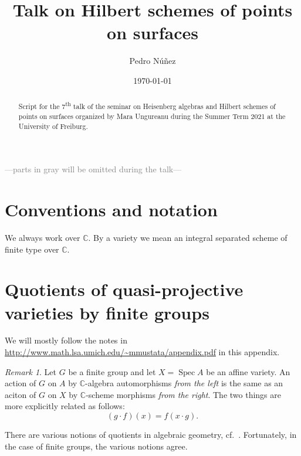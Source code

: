 \documentclass[12pt,a4paper]{amsart}
\title[Talk on Hilbert schemes of points on surfaces]{Talk on Hilbert schemes of points on surfaces}
\author[Pedro N\'{u}\~{n}ez]{Pedro N\'{u}\~{n}ez}
\date{\today}
\theoremstyle{plain}
\theoremstyle{definition}
\theoremstyle{remark}
\newtheorem{rem}[thm]{Remark}
\begin{document}
\maketitle

\begin{abstract}
  Script for the 7\textsuperscript{th} talk of the seminar on Heisenberg algebras and Hilbert schemes of points on surfaces organized by Mara Ungureanu during the Summer Term 2021 at the University of Freiburg.
\end{abstract}

\tableofcontents

\begin{center}
  \textcolor{gray}{---parts in gray will be omitted during the talk---}
\end{center}

\setcounter{section}{-1}

\section{Conventions and notation}

We always work over $\mathbb{C}$.
By a variety we mean an integral separated scheme of finite type over $\mathbb{C}$.

\appendix

\section{Quotients of quasi-projective varieties by finite groups}

We will mostly follow the notes in \url{http://www.math.lsa.umich.edu/~mmustata/appendix.pdf} in this appendix.

\begin{rem}
  Let $G$ be a finite group and let $X = \operatorname{Spec}{A}$ be an affine variety.
  An action of $G$ on $A$ by $\mathbb{C}$-algebra automorphisms \textit{from the left} is the same as an aciton of $G$ on $X$ by $\mathbb{C}$-scheme morphisms \textit{from the right}.
  The two things are more explicitly related as follows:
  \[ (g \cdot f)(x) = f(x \cdot g). \]
\end{rem}

There are various notions of quotients in algebraic geometry, cf.~\cite[\S 0.1]{mfk94}.
Fortunately, in the case of finite groups, the various notions agree.
\end{document}
